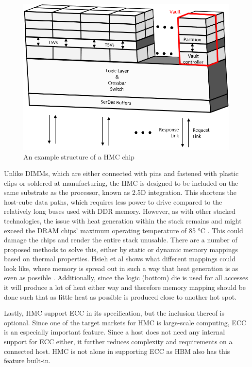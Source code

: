 \begin{figure}[h!]
\centering
\includegraphics[width=0.75\linewidth]{figure/HMC_structures.png}
\caption{An example structure of a HMC chip }
\label{HMC-structure}
\end{figure}

Unlike DIMMs, which are either connected with pins and fastened with plastic clips or soldered at manufacturing, the HMC is designed to be included on the same substrate as the processor, known as 2.5D integration. This shortens the host-cube data paths, which requires less power to drive compared to the relatively long buses used with DDR memory. However, as with other stacked technologies, the issue with heat generation within the stack remains and might exceed the DRAM chips' maximum operating temperature of 85 °C \cite{7459470}. This could damage the chips and render the entire stack unusable. There are a number of proposed methods to solve this, either by static or dynamic memory mappings based on thermal properties. Hsieh et al shows what different mappings could look like, where memory is spread out in such a way that heat generation is as even as possible \cite{Hsieh:2013:TMM:2501626.2512457}. Additionally, since the logic (bottom) die is used for all accesses it will produce a lot of heat either way and therefore memory mapping should be done such that as little heat as possible is produced close to another hot spot.
\bigskip

Lastly, HMC support ECC in its specification, but the inclusion thereof is optional. Since one of the target markets for HMC is large-scale computing, ECC is an especially important feature. Since a host does not need any internal support for ECC either, it further reduces complexity and requirements on a connected host. HMC is not alone in supporting ECC as HBM also has this feature built-in.


